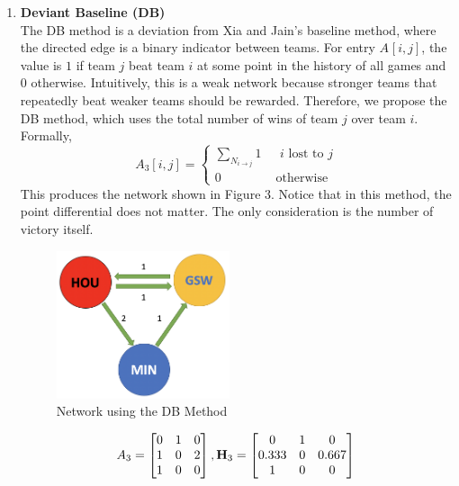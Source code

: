 \documentclass[12pt]{article}%
\begin{document}
\begin{enumerate}
  \item \textbf{Deviant Baseline (DB)}\\
  \null\quad\quad The DB method is a deviation from Xia and Jain's baseline method, where the directed edge is a binary indicator between teams. For entry $A_{}[i,j]$, the value is $1$ if team $j$ beat team $i$ at some point in the history of all games and $0$ otherwise. Intuitively, this is a weak network because stronger teams that repeatedly beat weaker teams should be rewarded. Therefore, we propose the DB method, which uses the total number of wins of team $j$ over team $i$. Formally,
  \[
  A_{3}[i,j]=
  \begin{cases}
  \sum_{N_{i\rightarrow j}}1 &\text{ $i$ lost to $j$}\\
  0 &\text{ otherwise}
  \end{cases}
  \]
  This produces the network shown in Figure 3. Notice that in this method, the point differential does not matter. The only consideration is the number of victory itself.
  \begin{figure}[H]
	\centering
	\includegraphics[width=2in]{./images/DB.png}
	\caption[Network using the DB Method]{Network using the DB Method}
\end{figure}
\begin{align*}
A_3 =\begin{bmatrix}0 & 1 & 0\\1 & 0 & 2\\1 & 0 & 0\end{bmatrix}, \textbf H_3=\begin{bmatrix}0 & 1 & 0\\0.333 & 0 & 0.667\\1 & 0 & 0\end{bmatrix}
\end{align*}


\end{enumerate}
\end{document}
